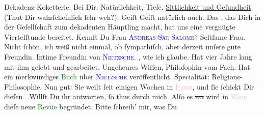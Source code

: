 \documentclass[twoside=false,titlepage=false,open=any, parskip=never, fontsize=12pt, headings=small, chapterprefix=false, appendixprefix=false]{scrbook}
\newcommand{\strikeout}[1]{\sout{#1}}
\newcommand{\pbposition}{\depth}
\newcommand{\pb}{\nobreak\hspace{0pt}\raisebox{-0.1em}{\raisebox{\pbposition}{\textnormal{|}}}\nobreak\hspace{0pt}}
\begin{document}
               Dekadenz-Koketterie. Bei Dir: Na{\pb}türlichkeit, Tiefe,
                  \uline{Sittlichkeit und Geſundheit} (Thut Dir
               wahrſcheinlich ſehr weh?). \strikeout{Geiſt} Geiſt natürlich
               auch. Das \label{K_L02621-333v}\label{K_L02621-333h}, das Dich in der Geſellſchaft zum dekadenten Häuptling
               macht, hat uns eine vergnügte Viertelſtunde bereitet.\pend
           \pstart
           Kennſt Du Frau \textsc{\textcolor{blue}{Andreas-\strikeout{Sa\textcolor{gray}{l}} Salome}{}\ledrightnote{\textcolor{blue}{Lou Andreas-Salomé}}}? Seltſame Frau. Nicht ſchön, ich weiß nicht einmal, ob ſympathiſch, aber
               derzeit unſere gute Freundin. Intime Freundin von \textsc{\textcolor{blue}{Nietzsche}{}\ledrightnote{\textcolor{blue}{Friedrich Nietzsche}}}. \label{K_L02621-6v}\label{K_L02621-6h}, wie ich glaube. Hat vier Jahre lang mit ihm
               gelebt und gearbeitet. Ungeheures Wiſſen, Philo{\pb}ſophin vom Fach. Hat ein merkwürdiges \textcolor{green}{Buch}{}\ledrightnote{\textcolor{green}{Friedrich Nietzsche in seinen Werken}}
               über \textsc{\textcolor{blue}{Nietzsche}{}\ledrightnote{\textcolor{blue}{Friedrich Nietzsche}}} veröffentlicht. Specialität: Religions-Philosophie. Nun gut: Sie weilt ſeit
               einigen Wochen in \textsc{\textcolor{pink}{Paris}{}\ledrightnote{\textcolor{pink}{Paris}}}, und ſie ſchickt Dir dieſen \label{K_L02621-9v}\label{K_L02621-9h}. Willſt Du ihr antworten, ſo thus
               durch mich.\pend
           \pstart
           Alſo es \strikeout{\textcolor{gray}{wa}} wird in \textcolor{pink}{Wien}{}\ledrightnote{\textcolor{pink}{Wien}} dieſe neue \textcolor{green}{Revüe}{} begründet. Bitte ſchreib’ mir, was Du
\end{document}
